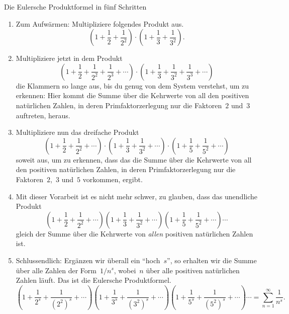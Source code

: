 \documentclass[twoside]{../zirkelblatt1415}
\theoremstyle{definition}
\theoremstyle{plain}
\theoremstyle{remark}
\begin{document}
\begin{aufgabe}{Die Eulersche Produktformel in fünf Schritten}
\label{aufg:euler-produkt}
\begin{enumerate}
\item Zum Aufwärmen: Multipliziere folgendes Produkt aus.
\[ \left(1 + \frac{1}{2} + \frac{1}{2^2}\right) \cdot
  \left(1 + \frac{1}{3} + \frac{1}{3^2}\right). \]
\item Multipliziere jetzt in dem Produkt
\[ \left(1 + \frac{1}{2} + \frac{1}{2^2} + \frac{1}{2^3} + \cdots\right) \cdot
  \left(1 + \frac{1}{3} + \frac{1}{3^2} + \frac{1}{3^3} + \cdots\right) \]
die Klammern so lange aus, bis du genug von dem System verstehst, um zu
erkennen: Hier kommt die Summe über die Kehrwerte von all den positiven
natürlichen Zahlen, in deren Primfaktorzerlegung nur die Faktoren~$2$ und~$3$
auftreten, heraus.
\item Multipliziere nun das dreifache Produkt
\[ \left(1 + \frac{1}{2} + \frac{1}{2^2} + \cdots\right) \cdot
  \left(1 + \frac{1}{3} + \frac{1}{3^2} + \cdots\right) \cdot
  \left(1 + \frac{1}{5} + \frac{1}{5^2} + \cdots\right) \]
soweit aus, um zu erkennen, dass das die Summe über die Kehrwerte von all den
positiven natürlichen Zahlen, in deren Primfaktorzerlegung nur die Faktoren~$2$,~$3$
und~$5$ vorkommen, ergibt.
\item Mit dieser Vorarbeit ist es nicht mehr schwer, zu glauben, dass das
unendliche Produkt
\[ \left(1 + \frac{1}{2} + \frac{1}{2^2} + \cdots\right)
  \left(1 + \frac{1}{3} + \frac{1}{3^2} + \cdots\right)
  \left(1 + \frac{1}{5} + \frac{1}{5^2} + \cdots\right) \cdots \]
gleich der Summe über die Kehrwerte von \emph{allen} positiven natürlichen Zahlen ist.
\item Schlussendlich: Ergänzen wir überall ein "`hoch~$s$"', so erhalten wir
die Summe über alle Zahlen der Form~$1/n^s$, wobei~$n$ über alle positiven
natürlichen Zahlen läuft. Das ist die Eulersche Produktformel.
\[\textstyle \left(1 + \frac{1}{2^s} + \frac{1}{(2^2)^s} + \cdots\right)
  \left(1 + \frac{1}{3^s} + \frac{1}{(3^2)^s} + \cdots\right)
  \left(1 + \frac{1}{5^s} + \frac{1}{(5^2)^s} + \cdots\right) \cdots =
  \sum_{n=1}^\infty \frac{1}{n^s}. \]
\end{enumerate}\fixlistspacing
\end{aufgabe}
\end{document}
